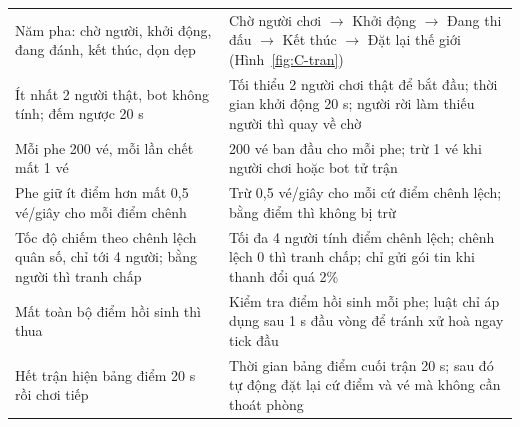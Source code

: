 \begin{center}\small
\begin{tabularx}{\linewidth}{|L{4.4cm}|Y|}
\hline
{} &  \\ \hline
Năm pha: chờ người, khởi động, đang đánh, kết thúc, dọn dẹp & Chờ người chơi $\rightarrow$ Khởi động $\rightarrow$ Đang thi đấu $\rightarrow$ Kết thúc $\rightarrow$ Đặt lại thế giới (Hình~\ref{fig:C-tran}) \\ \hline
Ít nhất 2 người thật, bot không tính; đếm ngược 20 s & Tối thiểu 2 người chơi thật để bắt đầu; thời gian khởi động 20 s; người rời làm thiếu người thì quay về chờ \\ \hline
Mỗi phe 200 vé, mỗi lần chết mất 1 vé & 200 vé ban đầu cho mỗi phe; trừ 1 vé khi người chơi hoặc bot tử trận \\ \hline
Phe giữ ít điểm hơn mất 0,5 vé/giây cho mỗi điểm chênh & Trừ 0,5 vé/giây cho mỗi cứ điểm chênh lệch; bằng điểm thì không bị trừ \\ \hline
Tốc độ chiếm theo chênh lệch quân số, chỉ tới 4 người; bằng người thì tranh chấp & Tối đa 4 người tính điểm chênh lệch; chênh lệch 0 thì tranh chấp; chỉ gửi gói tin khi thanh đổi quá 2\% \\ \hline
Mất toàn bộ điểm hồi sinh thì thua & Kiểm tra điểm hồi sinh mỗi phe; luật chỉ áp dụng sau 1 s đầu vòng để tránh xử hoà ngay tick đầu \\ \hline
Hết trận hiện bảng điểm 20 s rồi chơi tiếp & Thời gian bảng điểm cuối trận 20 s; sau đó tự động đặt lại cứ điểm và vé mà không cần thoát phòng \\ \hline
\end{tabularx}
\end{center}


